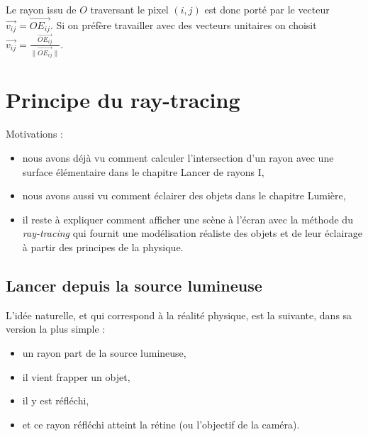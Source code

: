 \documentclass[11pt,class=report,crop=false]{standalone}
\begin{document}
Le rayon issu de $O$ traversant le pixel $(i,j)$ est donc porté par le vecteur $\vec{v_{ij}} = \vec{OE_{ij}}$. Si on préfère travailler avec des vecteurs unitaires on choisit $\vec{v_{ij}} = \frac{\vec{OE_{ij}}}{\| \vec{OE_{ij}} \|} $.



\section{Principe du ray-tracing}

Motivations :
\begin{itemize}
	\item nous avons déjà vu comment calculer l'intersection d'un rayon avec une surface élémentaire dans le chapitre \og{}Lancer de rayons I\fg{},
	
	\item nous avons aussi vu comment éclairer des objets dans le chapitre \og{}Lumière\fg{},
	
	\item il reste à expliquer comment afficher une scène à l'écran avec la méthode du \emph{ray-tracing} qui fournit une modélisation réaliste des objets et de leur éclairage à partir des principes de la physique.
	
\end{itemize}


\subsection{Lancer depuis la source lumineuse}

L'idée naturelle, et qui correspond à la réalité physique, est la suivante, dans sa version la plus simple :
\begin{itemize}
	\item un rayon part de la source lumineuse,
	\item il vient frapper un objet,
	\item il y est réfléchi,
	\item et ce rayon réfléchi atteint la rétine (ou l'objectif de la caméra).
\end{itemize}


\end{document}
